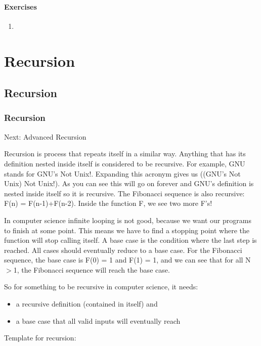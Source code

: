\documentclass[11pt,oneside]{book}
\begin{document}
\subsection{Exercises}

\begin{enumerate}
\item 
\end{enumerate}

\part{ Recursion }
    \chapter{ Recursion }
        \section{ Recursion }
        

Next: Advanced Recursion

Recursion is process that repeats itself in a similar way. Anything that has its definition nested inside itself is considered to be recursive. For example, GNU stands for GNU's Not Unix!. Expanding this acronym gives us ((GNU's Not Unix) Not Unix!). As you can see this will go on forever and GNU's definition is nested inside itself so it is recursive. The Fibonacci sequence is also recursive: F(n) = F(n-1)+F(n-2). Inside the function F, we see two more F's!

In computer science infinite looping is not good, because we want our programs to finish at some point. This means we have to find a stopping point where the function will stop calling itself. A base case is the condition where the last step is reached. All cases should eventually reduce to a base case. For the Fibonacci sequence, the base case is F(0) = 1 and F(1) = 1, and we can see that for all N$>$1, the Fibonacci sequence will reach the base case.

So for something to be recursive in computer science, it needs:

\begin{itemize}
\item a recursive definition (contained in itself) and 
\item a base case that all valid inputs will eventually reach
\end{itemize}

Template for recursion:
\end{document}
